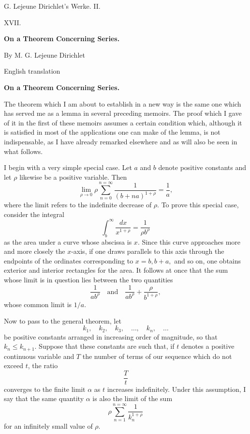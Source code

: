\documentclass[11pt]{article}
\begin{document}
\begin{center}
{\Large G. Lejeune Dirichlet's Werke. II.}\par\vspace{1.2em}
{\Large XVII.}\par\vspace{0.5em}
{\LARGE \textbf{On a Theorem Concerning Series.}}\par\vspace{1em}
{\large By M. G. Lejeune Dirichlet}\par\vspace{0.5em}
{\small English translation}
\end{center}

\begin{center}
{\large \textbf{On a Theorem Concerning Series.}}
\end{center}

The theorem which I am about to establish in a new way is the same one which has served me as a lemma in several preceding memoirs. The proof which I gave of it in the first of these memoirs assumes a certain condition which, although it is satisfied in most of the applications one can make of the lemma, is not indispensable, as I have already remarked elsewhere and as will also be seen in what follows.

I begin with a very simple special case. Let \(a\) and \(b\) denote positive constants and let \(\rho\) likewise be a positive variable. Then
\[
\lim_{\rho\to0}\rho\sum_{n=0}^{n=\infty}\frac{1}{(b+na)^{1+\rho}}=\frac{1}{a},
\]
where the limit refers to the indefinite decrease of \(\rho\). To prove this special case, consider the integral
\[
\int_b^\infty\frac{dx}{x^{1+\rho}}=\frac{1}{\rho b^\rho}
\]
as the area under a curve whose abscissa is \(x\). Since this curve approaches more and more closely the \(x\)-axis, if one draws parallels to this axis through the endpoints of the ordinates corresponding to \(x=b,b+a,\) and so on, one obtains exterior and interior rectangles for the area. It follows at once that the sum whose limit is in question lies between the two quantities
\[
\frac{1}{ab^\rho}
\quad\text{and}\quad
\frac{1}{ab^\rho}+\frac{\rho}{b^{1+\rho}},
\]
whose common limit is \(1/a\).

Now to pass to the general theorem, let
\[
k_1,\quad k_2,\quad k_3,\quad \ldots,\quad k_n,\quad \ldots
\]
be positive constants arranged in increasing order of magnitude, so that \(k_n\leq k_{n+1}\). Suppose that these constants are such that, if \(t\) denotes a positive continuous variable and \(T\) the number of terms of our sequence which do not exceed \(t\), the ratio
\[
\frac{T}{t}
\]
converges to the finite limit \(\alpha\) as \(t\) increases indefinitely. Under this assumption, I say that the same quantity \(\alpha\) is also the limit of the sum
\[
\tag{1} \rho\sum_{n=1}^{n=\infty}\frac{1}{k_n^{1+\rho}}
\]
for an infinitely small value of \(\rho\).
\end{document}
